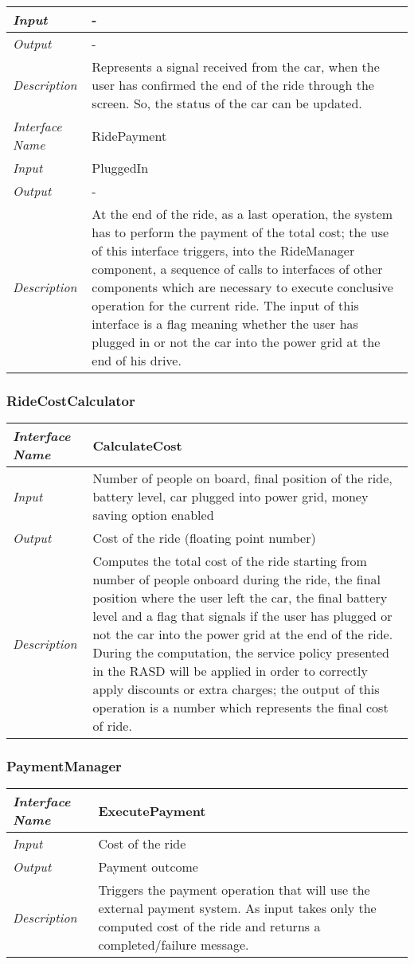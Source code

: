 \documentclass[11pt,a4paper]{report}
\begin{document}
\begin{tabularx}{\textwidth}{|>{\em}l|X|}
	\hline
	Input &-\\
	\hline
	Output & -\\
	\hline
	Description &Represents a signal received from the car, when the user has confirmed the end of the ride through the screen. So, the status of the car can be updated.\\
	\hline
	\hline
	Interface Name& RidePayment\\
	\hline
	Input &PluggedIn\\
	\hline
	Output & -\\
	\hline
	Description &At the end of the ride, as a last operation, the system has to perform the payment of the total cost; the use of this interface triggers, into the RideManager component, a sequence of calls to interfaces of other components which are necessary to execute conclusive operation for the current ride. The input of this interface is a flag meaning whether the user has plugged in or not the car into the power grid at the end of his drive. \\
	\hline
\end{tabularx}
\subsubsection{RideCostCalculator}
\begin{tabularx}{\textwidth}{|>{\em}l|X|}
	\hline
	Interface Name& CalculateCost\\
	\hline
	Input & Number of people on board, final position of the ride, battery level, car plugged into power grid, money saving option enabled\\
	\hline
	Output & Cost of the ride (floating point number)\\
	\hline
	Description &Computes the total cost of the ride starting from number of people onboard during the ride, the final position where the user left the car, the final battery level and a flag that signals if the user has plugged or not the car into the power grid at the end of the ride. During the computation, the service policy presented in the RASD will be applied in order to correctly apply discounts or extra charges; the output of this operation is a number which represents the final cost of ride.\\
	\hline
\end{tabularx}

\subsubsection{PaymentManager}
\begin{tabularx}{\textwidth}{|>{\em}l|X|}
	\hline
	Interface Name& ExecutePayment\\
	\hline
	Input & Cost of the ride\\
	\hline
	Output & Payment outcome\\
	\hline
	Description &Triggers the payment operation that will use the external payment system. As input takes only the computed cost of the ride and returns a completed/failure message.\\
	\hline
\end{tabularx}
\end{document}

